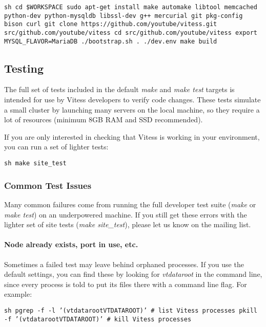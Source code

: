 {\tt sh
cd \$WORKSPACE
sudo apt-get install make automake libtool memcached python-dev python-mysqldb libssl-dev g++ mercurial git pkg-config bison curl
git clone https://github.com/youtube/vitess.git src/github.com/youtube/vitess
cd src/github.com/youtube/vitess
export MYSQL\_FLAVOR=MariaDB
./bootstrap.sh
. ./dev.env
make build
}

\subsection{Testing}\hypertarget{testing}{}\label{testing}

The full set of tests included in the default \emph{make} and \emph{make test} targets
is intended for use by Vitess developers to verify code changes.
These tests simulate a small cluster by launching many servers on the local
machine, so they require a lot of resources (minimum 8GB RAM and SSD recommended).

If you are only interested in checking that Vitess is working in your
environment, you can run a set of lighter tests:

{\tt sh
make site\_test
}

\subsubsection{Common Test Issues}\hypertarget{common-test-issues}{}\label{common-test-issues}

Many common failures come from running the full developer test suite
(\emph{make} or \emph{make test}) on an underpowered machine. If you still get
these errors with the lighter set of site tests (\emph{make site\_test}),
please let us know on the mailing list.

\paragraph{Node already exists, port in use, etc.}\hypertarget{node-already-exists-port-in-use-etc}{}\label{node-already-exists-port-in-use-etc}

Sometimes a failed test may leave behind orphaned processes.
If you use the default settings, you can find these by looking for
\emph{vtdataroot} in the command line, since every process is told to put
its files there with a command line flag. For example:

{\tt sh
pgrep -f -l '(vtdataroot\textbar{}VTDATAROOT)' \# list Vitess processes
pkill -f '(vtdataroot\textbar{}VTDATAROOT)' \# kill Vitess processes
}

